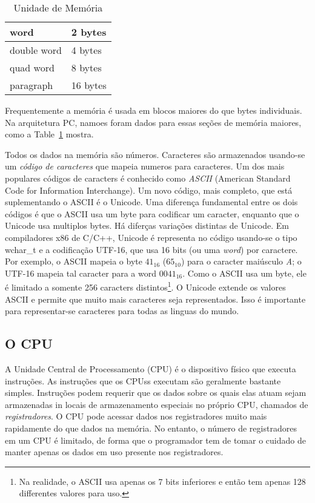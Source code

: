 \begin{table}
\begin{center}
\begin{tabular}{|l|l|}
\hline
word & 2 bytes \\ \hline
double word & 4 bytes \\ \hline
quad word & 8 bytes \\ \hline
paragraph & 16 bytes \\ \hline
\end{tabular}
\caption{ Unidade de Memória \label{tab:mem_units} }
\end{center}
\end{table}

Frequentemente a memória é usada em blocos maiores do que bytes individuais. 
Na arquitetura PC, namoes foram dados para essas seções de memória maiores, 
como a Table~\ref{tab:mem_units} mostra.

Todos os dados na memória são números. Caracteres são armazenados usando-se um 
\emph{código de caracteres} que mapeia numeros para caracteres. Um dos mais 
populares códigos de caracters é conhecido como \emph{ASCII} (American 
Standard Code for Information Interchange). Um novo código, mais completo, que 
está suplementando o ASCII é o Unicode. Uma diferença fundamental entre os 
dois códigos é que o ASCII usa um byte para codificar um caracter, enquanto 
que o Unicode usa multiplos bytes. Há diferças variações distintas de 
Unicode. Em compiladores x86 de C/C++, Unicode é representa no código 
usando-se o tipo {\code wchar\_t} e a codificação UTF-16, que usa 16 bits (ou 
uma \emph{word}) por caractere. Por exemplo, o ASCII mapeia o byte $41_{16}$ 
($65_{10}$) para o caracter maiúsculo \emph{A}; o UTF-16 mapeia tal caracter 
para a word $0041_{16}$. Como o ASCII usa um byte, ele é limitado a somente 
256 caracters distintos\footnote{Na realidade, o ASCII usa apenas os 7 bits 
inferiores e então tem apenas 128 differentes valores para uso.}. O Unicode 
extende os valores ASCII e permite que muito mais caracteres seja 
representados. Isso é importante para representar-se caracteres para todas as 
linguas do mundo.

\subsection{O CPU}

A Unidade Central de Processamento (CPU) é o dispositivo físico que executa 
instruções. As instruções que os CPUss executam são geralmente bastante 
simples. Instruções podem requerir que os dados sobre os quais elas atuam 
sejam armazenadas in locais de armazenamento especiais no próprio CPU, 
chamados de \emph{registradores}.  O CPU pode acessar dados 
nos registradores muito mais rapidamente do que dados na memória. No entanto, 
o número de registradores em um CPU é limitado, de forma que o programador tem 
de tomar o cuidado de manter apenas os dados em uso presente nos registradores.

